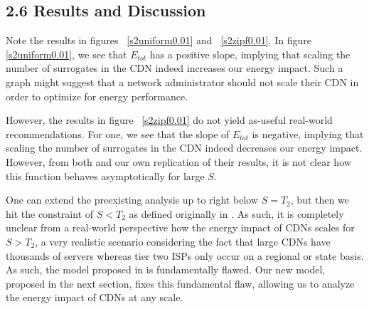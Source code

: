 \documentclass[
	a4paper, %
	10pt, %
	unnumberedsections, %
	twoside, %
]{LTJournalArticle}
\begin{document}
\subsection{2.6 Results and Discussion}
Note the results in figures ~\ref{s2uniform0.01} and ~\ref{s2zipf0.01}. In figure \ref{s2uniform0.01}, we see that $E_{tot}$ has a positive slope, implying that scaling the number of surrogates in the CDN indeed increases our energy impact. Such a graph might suggest that a network administrator should not scale their CDN in order to optimize for energy performance.

However, the results in figure ~\ref{s2zipf0.01} do not yield as-useful real-world recommendations. For one, we see that the slope of $E_{tot}$ is negative, implying that scaling the number of surrogates in the CDN indeed decreases our energy impact. However, from both \cite{biancoCDNs2017} and our own replication of their results, it is not clear how this function behaves asymptotically for large $S$. 

One can extend the preexisting analysis up to right below $S = T_2$, but then we hit the constraint of $S < T_2$ as defined originally in \cite{biancoCDNs2017}. As such, it is completely unclear from a real-world perspective how the energy impact of CDNs scales for $S > T_2$, a very realistic scenario considering the fact that large CDNs have thousands of servers whereas tier two ISPs only occur on a regional or state basis. As such, the model proposed in \cite{biancoCDNs2017} is fundamentally flawed. Our new model, proposed in the next section, fixes this fundamental flaw, allowing us to analyze the energy impact of CDNs at any scale.
\end{document}
